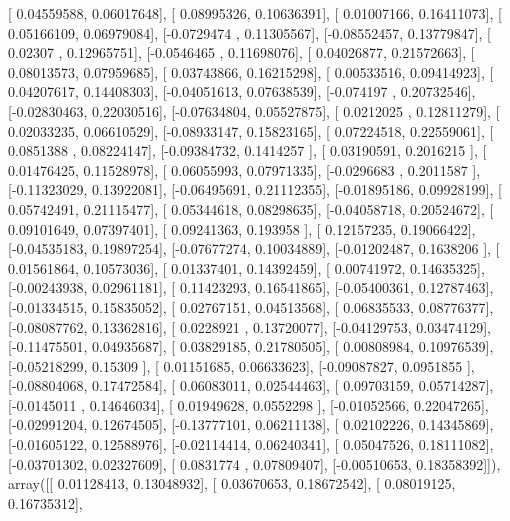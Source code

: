 \documentclass{article}
\begin{document}
       [ 0.04559588,  0.06017648],
       [ 0.08995326,  0.10636391],
       [ 0.01007166,  0.16411073],
       [ 0.05166109,  0.06979084],
       [-0.0729474 ,  0.11305567],
       [-0.08552457,  0.13779847],
       [ 0.02307   ,  0.12965751],
       [-0.0546465 ,  0.11698076],
       [ 0.04026877,  0.21572663],
       [ 0.08013573,  0.07959685],
       [ 0.03743866,  0.16215298],
       [ 0.00533516,  0.09414923],
       [ 0.04207617,  0.14408303],
       [-0.04051613,  0.07638539],
       [-0.074197  ,  0.20732546],
       [-0.02830463,  0.22030516],
       [-0.07634804,  0.05527875],
       [ 0.0212025 ,  0.12811279],
       [ 0.02033235,  0.06610529],
       [-0.08933147,  0.15823165],
       [ 0.07224518,  0.22559061],
       [ 0.0851388 ,  0.08224147],
       [-0.09384732,  0.1414257 ],
       [ 0.03190591,  0.2016215 ],
       [ 0.01476425,  0.11528978],
       [ 0.06055993,  0.07971335],
       [-0.0296683 ,  0.2011587 ],
       [-0.11323029,  0.13922081],
       [-0.06495691,  0.21112355],
       [-0.01895186,  0.09928199],
       [ 0.05742491,  0.21115477],
       [ 0.05344618,  0.08298635],
       [-0.04058718,  0.20524672],
       [ 0.09101649,  0.07397401],
       [ 0.09241363,  0.193958  ],
       [ 0.12157235,  0.19066422],
       [-0.04535183,  0.19897254],
       [-0.07677274,  0.10034889],
       [-0.01202487,  0.1638206 ],
       [ 0.01561864,  0.10573036],
       [ 0.01337401,  0.14392459],
       [ 0.00741972,  0.14635325],
       [-0.00243938,  0.02961181],
       [ 0.11423293,  0.16541865],
       [-0.05400361,  0.12787463],
       [-0.01334515,  0.15835052],
       [ 0.02767151,  0.04513568],
       [ 0.06835533,  0.08776377],
       [-0.08087762,  0.13362816],
       [ 0.0228921 ,  0.13720077],
       [-0.04129753,  0.03474129],
       [-0.11475501,  0.04935687],
       [ 0.03829185,  0.21780505],
       [ 0.00808984,  0.10976539],
       [-0.05218299,  0.15309   ],
       [ 0.01151685,  0.06633623],
       [-0.09087827,  0.0951855 ],
       [-0.08804068,  0.17472584],
       [ 0.06083011,  0.02544463],
       [ 0.09703159,  0.05714287],
       [-0.0145011 ,  0.14646034],
       [ 0.01949628,  0.0552298 ],
       [-0.01052566,  0.22047265],
       [-0.02991204,  0.12674505],
       [-0.13777101,  0.06211138],
       [ 0.02102226,  0.14345869],
       [-0.01605122,  0.12588976],
       [-0.02114414,  0.06240341],
       [ 0.05047526,  0.18111082],
       [-0.03701302,  0.02327609],
       [ 0.0831774 ,  0.07809407],
       [-0.00510653,  0.18358392]]), array([[ 0.01128413,  0.13048932],
       [ 0.03670653,  0.18672542],
       [ 0.08019125,  0.16735312],
\end{document}
